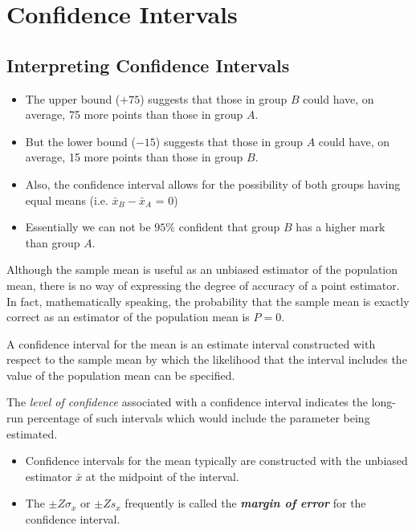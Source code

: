 \documentclass[]{report}
\begin{document}
\section*{Confidence Intervals}
\subsection{Interpreting Confidence Intervals}
\begin{itemize}
\item The upper bound ($+75$) suggests that those in group $B$ could have, on average, 75 more points than those in group $A$.
\item But the lower bound ($-15$) suggests  that those in group $A$ could have, on average, 15 more points than those in group $B$.
\item Also, the confidence interval allows for the possibility of both groups having equal means  (i.e. $\bar{x}_B-\bar{x}_A$ = 0)
\item Essentially we can not be $95\%$ confident that group $B$ has a higher mark than group $A$.
\end{itemize}


Although the sample mean is useful as an unbiased estimator of the population mean, there is no way of
expressing the degree of accuracy of a point estimator. In fact, mathematically speaking, the probability that the
sample mean is exactly correct as an estimator of the population mean is $P = 0$.


A confidence interval for the
mean is an estimate interval constructed with respect to the sample mean by which the likelihood that the interval
includes the value of the population mean can be specified.

The \emph{level of confidence} associated with a confidence interval indicates the long-run percentage
 of such intervals which would include the parameter being estimated.


\begin{itemize}
\item Confidence intervals for the mean typically are constructed with the unbiased estimator $\bar{x}$ at the midpoint
of the interval.

\item The $\pm Z \sigma_x$ or $\pm Z s_x$ frequently is called the \textbf{\emph{margin of error}} for the confidence interval.
\end{itemize}
\end{document}
